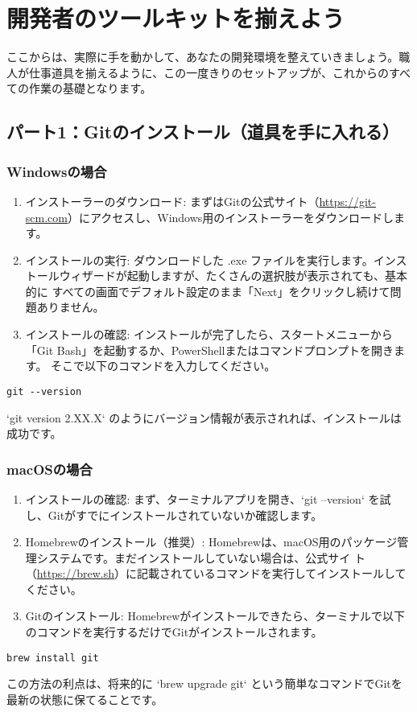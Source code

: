 \documentclass{ltjsarticle}
\begin{document}
\section{開発者のツールキットを揃えよう}
ここからは、実際に手を動かして、あなたの開発環境を整えていきましょう。職人が仕事道具を揃えるように、この一度きりのセットアップが、これからのすべての作業の基礎となります。

\subsection{パート1：Gitのインストール（道具を手に入れる）}
\subsubsection{Windowsの場合}
\begin{enumerate}
    \item インストーラーのダウンロード: まずはGitの公式サイト（\url{https://git-scm.com}）にアクセスし、Windows用のインストーラーをダウンロードします。
    \item インストールの実行: ダウンロードした .exe ファイルを実行します。インストールウィザードが起動しますが、たくさんの選択肢が表示されても、基本的に
    すべての画面でデフォルト設定のまま「Next」をクリックし続けて問題ありません。
    \item インストールの確認: インストールが完了したら、スタートメニューから「Git Bash」を起動するか、PowerShellまたはコマンドプロンプトを開きます。
    そこで以下のコマンドを入力してください。
\end{enumerate}
\begin{verbatim}
git --version
\end{verbatim}
`git version 2.XX.X` のようにバージョン情報が表示されれば、インストールは成功です。

\subsubsection{macOSの場合}
\begin{enumerate}
    \item インストールの確認: まず、ターミナルアプリを開き、`git --version` を試し、Gitがすでにインストールされていないか確認します。
    \item Homebrewのインストール（推奨）: Homebrewは、macOS用のパッケージ管理システムです。まだインストールしていない場合は、公式サイ
    ト（\url{https://brew.sh}）に記載されているコマンドを実行してインストールしてください。
    \item Gitのインストール: Homebrewがインストールできたら、ターミナルで以下のコマンドを実行するだけでGitがインストールされます。
\end{enumerate}
\begin{verbatim}
brew install git
\end{verbatim}
この方法の利点は、将来的に `brew upgrade git` という簡単なコマンドでGitを最新の状態に保てることです。
\end{document}
